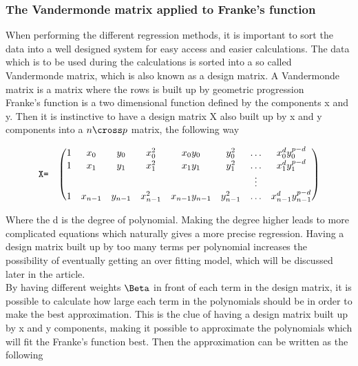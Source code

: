 \subsubsection{The Vandermonde matrix applied to Franke's function}

When performing the different regression methods, it is important to sort the data into a well designed system for easy access and easier calculations. The data which is to be used during the calculations is sorted into a so called Vandermonde matrix, which is also known as a design matrix. A Vandermonde matrix is a matrix where the rows is built up by geometric progression \\%

Franke's function is a two dimensional function defined by the components x and y. Then it is instinctive to have a design matrix X also built up by x and y components into a $n\cross p$ matrix, the following way

\[
\begin{array}{lccccccc}
  \verb|X=| & \left(\begin{array}{@{}cccccccc@{}}
   1& x_0 & y_0 & x_0^2 & x_0y_0 & y_0^2 & \ldots & x_0^d y_0^{p-d}\\
    1& x_1 & y_1 & x_1^2 & x_1y_1 & y_1^2 & \ldots & x_1^d y_1^{p-d}\\
    & &  &  &  &  & \vdots & \\
    1 & x_{n-1} & y_{n-1} & x_{n-1}^2 & x_{n-1}y_{n-1} & y_{n-1}^2 & \ldots & x_{n-1}^d y_{n-1}^{p-d}\\
 \end{array}\right) \\[15pt]
\end{array}
\]

Where the d is the degree of polynomial. Making the degree higher leads to more complicated equations which naturally gives a more precise regression. Having a design matrix built up by too many terms per polynomial increases the possibility of eventually getting an over fitting model, which will be discussed later in the article.\\

By having different weights $\Beta$ in front of each term in the design matrix, it is possible to calculate how large each term in the polynomials should be in order to make the best approximation. This is the clue of having a design matrix built up by x and y components, making it possible to approximate the polynomials which will fit the Franke's function best. Then the approximation can be written as the following

